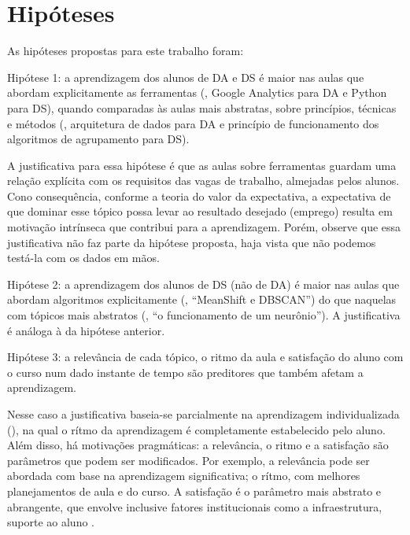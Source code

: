 \section{Hipóteses}
\label{sec:hipóteses}

As hipóteses propostas para este trabalho foram:
\begin{compactdesc}
	\item[Hipótese 1:] a aprendizagem dos alunos de DA e DS é maior nas aulas que abordam explicitamente as ferramentas (\eg, Google Analytics para DA e Python para DS), quando comparadas às aulas mais abstratas, sobre princípios, técnicas e métodos (\eg, arquitetura de dados para DA e princípio de funcionamento dos algoritmos de agrupamento para DS).

	A justificativa para essa hipótese é que as aulas sobre ferramentas guardam uma relação explícita com os requisitos das vagas de trabalho, almejadas pelos alunos.
	Cono consequência, conforme a teoria do valor da expectativa, a expectativa de que dominar esse tópico possa levar ao resultado desejado (emprego) resulta em motivação intrínseca que contribui para a aprendizagem.
	Porém, observe que essa justificativa não faz parte da hipótese proposta, haja vista que não podemos testá-la com os dados em mãos.

	\item[Hipótese 2:] a aprendizagem dos alunos de DS (não de DA) é maior nas aulas que abordam algoritmos explicitamente (\eg, ``MeanShift e DBSCAN'') do que naquelas com tópicos mais abstratos (\eg, ``o funcionamento de um neurônio'').
	A justificativa é análoga à da hipótese anterior.

	\item[Hipótese 3:] a relevância de cada tópico, o ritmo da aula e satisfação do aluno com o curso num dado instante de tempo são preditores que também afetam a aprendizagem.

	Nesse caso a justificativa baseia-se parcialmente na aprendizagem individualizada (), na qual o rítmo da aprendizagem é completamente estabelecido pelo aluno.
	Além disso, há motivações pragmáticas: a relevância, o ritmo e a satisfação são parâmetros que podem ser modificados.
	Por exemplo, a relevância pode ser abordada com base na aprendizagem significativa; o rítmo, com melhores planejamentos de aula e do curso.
	A satisfação é o parâmetro mais abstrato e abrangente, que envolve inclusive fatores institucionais como a infraestrutura, suporte ao aluno \etc.
\end{compactdesc}
